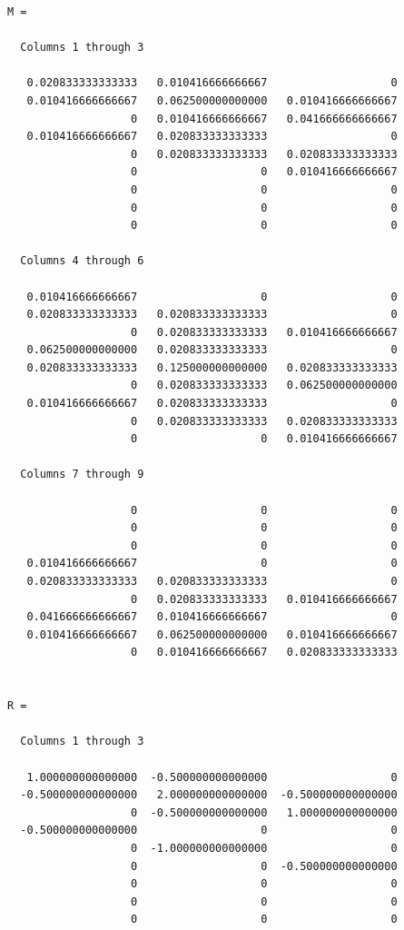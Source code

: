 \documentclass[11pt,a4paper,center,notitlepage]{article}
\numberwithin{equation}{section}
\begin{document}
\begin{verbatim}
M =

  Columns 1 through 3

   0.020833333333333   0.010416666666667                   0
   0.010416666666667   0.062500000000000   0.010416666666667
                   0   0.010416666666667   0.041666666666667
   0.010416666666667   0.020833333333333                   0
                   0   0.020833333333333   0.020833333333333
                   0                   0   0.010416666666667
                   0                   0                   0
                   0                   0                   0
                   0                   0                   0

  Columns 4 through 6

   0.010416666666667                   0                   0
   0.020833333333333   0.020833333333333                   0
                   0   0.020833333333333   0.010416666666667
   0.062500000000000   0.020833333333333                   0
   0.020833333333333   0.125000000000000   0.020833333333333
                   0   0.020833333333333   0.062500000000000
   0.010416666666667   0.020833333333333                   0
                   0   0.020833333333333   0.020833333333333
                   0                   0   0.010416666666667

  Columns 7 through 9

                   0                   0                   0
                   0                   0                   0
                   0                   0                   0
   0.010416666666667                   0                   0
   0.020833333333333   0.020833333333333                   0
                   0   0.020833333333333   0.010416666666667
   0.041666666666667   0.010416666666667                   0
   0.010416666666667   0.062500000000000   0.010416666666667
                   0   0.010416666666667   0.020833333333333


R =

  Columns 1 through 3

   1.000000000000000  -0.500000000000000                   0
  -0.500000000000000   2.000000000000000  -0.500000000000000
                   0  -0.500000000000000   1.000000000000000
  -0.500000000000000                   0                   0
                   0  -1.000000000000000                   0
                   0                   0  -0.500000000000000
                   0                   0                   0
                   0                   0                   0
                   0                   0                   0


\end{verbatim}
\end{document}
